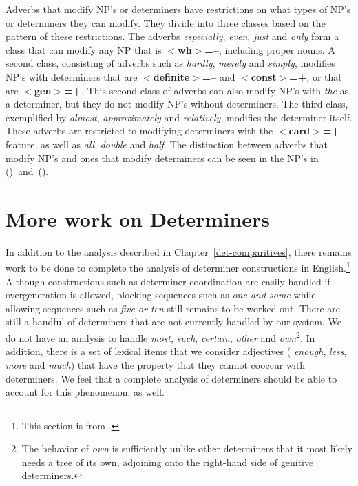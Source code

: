 Adverbs that modify NP's or determiners have restrictions on what types of NP's
or determiners they can modify. They divide into three classes based on the
pattern of these restrictions.  The adverbs {\it especially}, {\it even}, {\it
just} and {\it only} form a class that can modify any NP that is {\bf
$<$wh$>$=--}, including proper nouns.  A second class, consisting of adverbs
such as {\it hardly}, {\it merely} and {\it simply}, modifies NP's with
determiners that are {\bf $<$definite$>$=--} and {\bf $<$const$>$=+}, or that
are {\bf $<$gen$>$=+}.  This second class of adverbs can also modify NP's with
{\it the} as a determiner, but they do not modify NP's without determiners.
The third class, exemplified by {\it almost}, {\it approximately} and {\it
relatively}, modifies the determiner itself.  These adverbs are restricted to
modifying determiners with the {\bf $<$card$>$=+} feature, as well as {\it
all}, {\it double} and {\it half}.  The distinction between adverbs that modify
NP's and ones that modify determiners can be seen in the NP's in
({})~and~({}).





\section{More work on Determiners}

In addition to the analysis described in Chapter~\ref{det-comparitives}, there
remains work to be done to complete the analysis of determiner constructions in
English.\footnote{This section is from \cite{HockeyEgedi94}.}  Although
constructions such as determiner coordination are easily handled if
overgeneration is allowed, blocking sequences such as {\it one and some} while
allowing sequences such as {\it five or ten} still remains to be worked out.
There are still a handful of determiners that are not currently handled by our
system.  We do not have an analysis to handle {\it most}, {\it such}, {\it
certain}, {\it other} and {\it own}\footnote{The behavior of {\it own} is
sufficiently unlike other determiners that it most likely needs a tree of its
own, adjoining onto the right-hand side of genitive determiners.}.  In
addition, there is a set of lexical items that we consider adjectives ({\it
enough}, {\it less}, {\it more} and {\it much}) that have the property that
they cannot cooccur with determiners.  We feel that a complete analysis of
determiners should be able to account for this phenomenon, as well.




